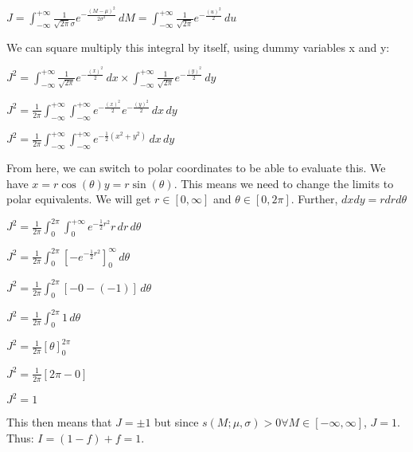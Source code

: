 \documentclass[12pt]{report} %
\begin{document}
\vspace*{1\baselineskip}
$J = \displaystyle \int_{-\infty}^{+\infty} \frac{1}{\sqrt{2\pi}\sigma} e^{-\frac{{(M - \mu)}^{2}}{2\sigma^{2}}}\, dM = \displaystyle \int_{-\infty}^{+\infty} \frac{1}{\sqrt{2\pi}} e^{-\frac{{(u)}^{2}}{2}}\, du$  

\vspace*{1\baselineskip}
We can square multiply this integral by itself, using dummy variables x and y:  

\vspace*{1\baselineskip}
$J^{2} = \displaystyle \int_{-\infty}^{+\infty} \frac{1}{\sqrt{2\pi}} e^{-\frac{{(x)}^{2}}{2}}\, dx \times \displaystyle \int_{-\infty}^{+\infty} \frac{1}{\sqrt{2\pi}} e^{-\frac{{(y)}^{2}}{2}}\, dy$  

$J^{2} = \frac{1}{2\pi}\displaystyle \int_{-\infty}^{+\infty} \int_{-\infty}^{+\infty}  e^{-\frac{{(x)}^{2}}{2}} e^{-\frac{{(y)}^{2}}{2}}\, dx \, dy$  

$J^{2} = \frac{1}{2\pi}\displaystyle \int_{-\infty}^{+\infty} \int_{-\infty}^{+\infty} e^{-\frac{1}{2}(x^{2}+y^{2})}\, dx \, dy$  

\vspace*{1\baselineskip}
From here, we can switch to polar coordinates to be able to evaluate this. We have $x = r\cos{(\theta)} y = r\sin{(\theta)}$. This means we need to change the limits to polar equivalents. We will get $r \in{[0,\infty]}$ and $\theta \in{[0,2\pi]}$. Further, $dx dy = r dr d\theta$  

\vspace*{1\baselineskip}
$J^{2} = \frac{1}{2\pi}\displaystyle \int_{0}^{2\pi} \int_{0}^{+\infty} e^{-\frac{1}{2}r^{2}}r\, dr \, d\theta$  

$J^{2} = \frac{1}{2\pi}\displaystyle \int_{0}^{2\pi} {[-e^{-\frac{1}{2}r^{2}}]}_{0}^{\infty}\, d\theta$  

$J^{2} = \frac{1}{2\pi}\displaystyle \int_{0}^{2\pi} [-0 - (-1)]\, d\theta$  

$J^{2} = \displaystyle \frac{1}{2\pi}\displaystyle \int_{0}^{2\pi} 1\, d\theta$  

$J^{2} = \displaystyle \frac{1}{2\pi}\displaystyle {[\theta]}_{0}^{2\pi}$  

$J^{2} = \displaystyle \frac{1}{2\pi}\displaystyle {[2\pi - 0]}$  

$J^{2} = 1$ 

\vspace*{1\baselineskip}
This then means that $J = \pm 1$ but since $s(M;\mu,\sigma) > 0 \forall M \in [-\infty,\infty]$, $ J = 1$. Thus: $I = (1-f) + f = 1$.  
\end{document}
